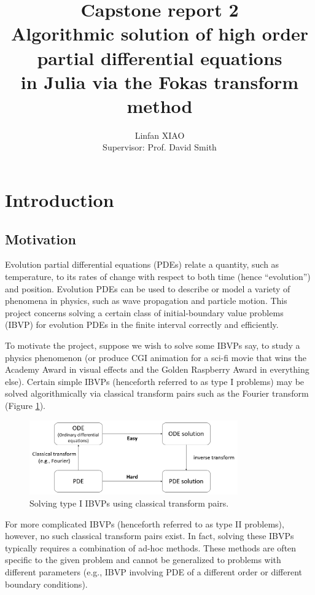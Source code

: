 \documentclass[11pt, oneside, a4paper]{article}
\author{Linfan XIAO\\
Supervisor: Prof. David Smith}
\title{Capstone report 2\\
Algorithmic solution of high order partial differential equations\\
in Julia via the Fokas transform method}
\date{\vspace{-5ex}}
\begin{document}
\maketitle

\thispagestyle{fancy}

\tableofcontents
\newpage
\section{Introduction}
\subsection{Motivation}
Evolution partial differential equations (PDEs) relate a quantity, such as temperature, to its rates of change with respect to both time (hence ``evolution'') and position. Evolution PDEs can be used to describe or model a variety of phenomena in physics, such as wave propagation and particle motion. This project concerns solving a certain class of initial-boundary value problems (IBVP) for evolution PDEs in the finite interval\cite{Smith2016} correctly and efficiently. 

To motivate the project, suppose we wish to solve some IBVPs say, to study a physics phenomenon (or produce CGI animation for a sci-fi movie that wins the Academy Award in visual effects and the Golden Raspberry Award in everything else). Certain simple IBVPs (henceforth referred to as type I problems) may be solved algorithmically via classical transform pairs such as the Fourier transform (Figure \ref{fig:classical_transform}).
\begin{figure}[htpb!]
    \centering
    \includegraphics[width=0.8\textwidth]{classical_transform.png}
    \caption{Solving type I IBVPs using classical transform pairs.}
    \label{fig:classical_transform}
\end{figure}

For more complicated IBVPs (henceforth referred to as type II problems), however, no such classical transform pairs exist. In fact, solving these IBVPs typically requires a combination of ad-hoc methods. These methods are often specific to the given problem and cannot be generalized to problems with different parameters (e.g., IBVP involving PDE of a different order or different boundary conditions). %
\end{document}
